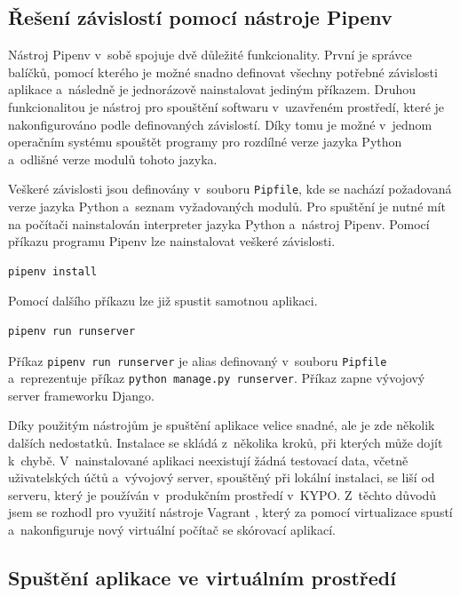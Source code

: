 \documentclass[
  digital,
  twoside,
  table, 
  nolof, 
  nolot
]{fithesis3}
\begin{document}
\subsection{Řešení závislostí pomocí nástroje Pipenv}
Nástroj Pipenv v~sobě spojuje dvě důležité funkcionality. První je správce balíčků, pomocí kterého je možné snadno definovat všechny potřebné závislosti aplikace a~následně je jednorázově nainstalovat jediným příkazem. Druhou funkcionalitou je nástroj pro spouštění softwaru v~uzavřeném prostředí, které je nakonfigurováno podle definovaných závislostí. Díky tomu je možné v~jednom operačním systému spouštět programy pro rozdílné verze jazyka Python a~odlišné verze modulů tohoto jazyka.

Veškeré závislosti jsou definovány v~souboru \texttt{Pipfile}, kde se nachází požadovaná verze jazyka Python a~seznam vyžadovaných modulů. Pro spuštění je nutné mít na počítači nainstalován interpreter jazyka Python a~nástroj Pipenv. Pomocí příkazu programu Pipenv lze nainstalovat veškeré závislosti.

\begin{lstlisting}
pipenv install
\end{lstlisting}

Pomocí dalšího příkazu lze již spustit samotnou aplikaci.

\begin{lstlisting}
pipenv run runserver
\end{lstlisting}

Příkaz \lstinline[columns=fixed]{pipenv run runserver} je alias definovaný v~souboru \texttt{Pipfile} a~reprezentuje příkaz \lstinline[columns=fixed]{python manage.py runserver}. Příkaz zapne vývojový server frameworku Django.

Díky použitým nástrojům je spuštění aplikace velice snadné, ale je zde několik dalších nedostatků. Instalace se skládá z~několika kroků, při kterých může dojít k~chybě. V~nainstalované aplikaci neexistují žádná testovací data, včetně uživatelských účtů a~vývojový server, spouštěný při lokální instalaci, se liší od serveru, který je používán v~produkčním prostředí v~KYPO. Z~těchto důvodů jsem se rozhodl pro využití nástroje Vagrant \cite{vagrant}, který za pomocí virtualizace spustí a~nakonfiguruje nový virtuální počítač se skórovací aplikací.

\subsection{Spuštění aplikace ve virtuálním prostředí}
\end{document}
